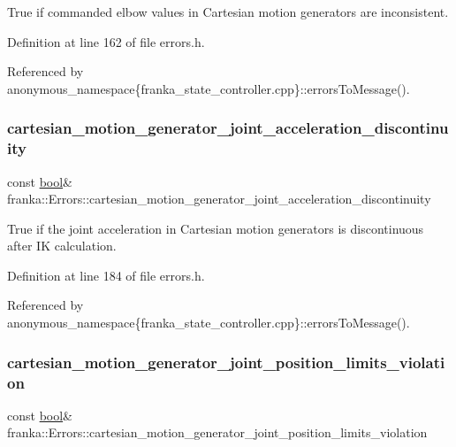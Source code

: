 True if commanded elbow values in Cartesian motion generators are inconsistent. 

Definition at line 162 of file errors.\+h.



Referenced by anonymous\+\_\+namespace\{franka\+\_\+state\+\_\+controller.\+cpp\}\+::errors\+To\+Message().

\mbox{\label{structfranka_1_1Errors_a2e223ef3c771709a6a3f094adf12f9cb}} 
\subsubsection{\texorpdfstring{cartesian\+\_\+motion\+\_\+generator\+\_\+joint\+\_\+acceleration\+\_\+discontinuity}{cartesian\_motion\_generator\_joint\_acceleration\_discontinuity}}
{\footnotesize\ttfamily const \hyperlink{classbool}{bool}\& franka\+::\+Errors\+::cartesian\+\_\+motion\+\_\+generator\+\_\+joint\+\_\+acceleration\+\_\+discontinuity}

True if the joint acceleration in Cartesian motion generators is discontinuous after IK calculation. 

Definition at line 184 of file errors.\+h.



Referenced by anonymous\+\_\+namespace\{franka\+\_\+state\+\_\+controller.\+cpp\}\+::errors\+To\+Message().

\mbox{\label{structfranka_1_1Errors_a73aef7473fd6d1d5b207e68fa35948c5}} 
\subsubsection{\texorpdfstring{cartesian\+\_\+motion\+\_\+generator\+\_\+joint\+\_\+position\+\_\+limits\+\_\+violation}{cartesian\_motion\_generator\_joint\_position\_limits\_violation}}
{\footnotesize\ttfamily const \hyperlink{classbool}{bool}\& franka\+::\+Errors\+::cartesian\+\_\+motion\+\_\+generator\+\_\+joint\+\_\+position\+\_\+limits\+\_\+violation}

